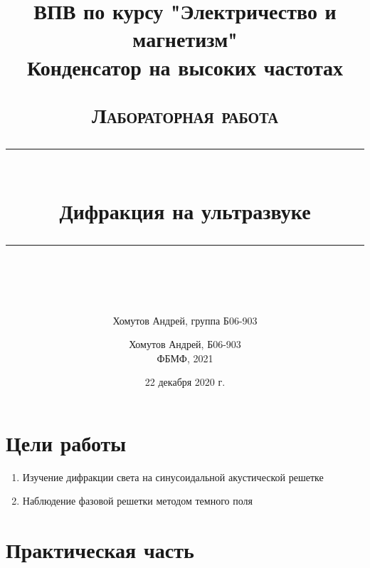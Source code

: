 \documentclass[a4paper, 12pt]{article}
\author{Хомутов Андрей, группа Б06-903}
\title{ВПВ по курсу "Электричество и магнетизм" \\ Конденсатор на высоких частотах}
\date{22 декабря 2020 г.}
\newcommand{\HRule}[1]{\rule{\linewidth}{#1}}
\begin{document}
\title{ \normalsize \textsc{Лабораторная работа}
		\\ [4.0cm]
		\HRule{0.5pt} \\ [0.3cm]
		\LARGE \textbf{{Дифракция на ультразвуке}}
		\HRule{0.5pt} \\ [0.1cm]
		\normalsize  \vspace*{18\baselineskip}}

\date{}

\author{%
		Хомутов Андрей, Б06-903 \\
ФБМФ, 2021\\ }

\maketitle
\thispagestyle{empty}
\newpage
\section*{Цели работы} 
\begin{enumerate}
    \item Изучение дифракции света на синусоидальной акустической решетке 
    \item Наблюдение фазовой решетки методом темного поля
\end{enumerate}
 



\section{Практическая часть}
\end{document}
